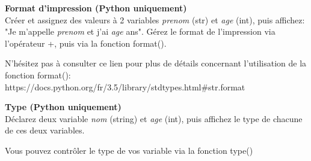 \begin{Exercice}[20 minutes] \textbf{Format d'impression (Python uniquement)}\\
   Créer et assignez des valeurs à 2 variables \textit{prenom} (str) et \textit{age} (int), puis affichez: "Je m'appelle \textit{prenom} et j'ai \textit{age} ans". Gérez le format de l'impression via l'opérateur +, puis via la fonction format(). \\
   
    \begin{conseil}
       N'hésitez pas à consulter ce lien pour plus de détails concernant l'utilisation de la fonction format(): \\
        https://docs.python.org/fr/3.5/library/stdtypes.html\#str.format 
        
    \end{conseil}
    \begin{solution}
     
    
           
    \end{solution}   
\end{Exercice}

\begin{Exercice}[20 minutes] \textbf{Type (Python uniquement)}\\
   Déclarez deux variable \textit{nom} (string) et \textit{age} (int), puis affichez le type de chacune de ces deux variables. \\
   
    \begin{conseil}
       Vous pouvez contrôler le type de vos variable via la fonction type()
        
    \end{conseil}
    \begin{solution}
     
    
           
    \end{solution}   
\end{Exercice}

